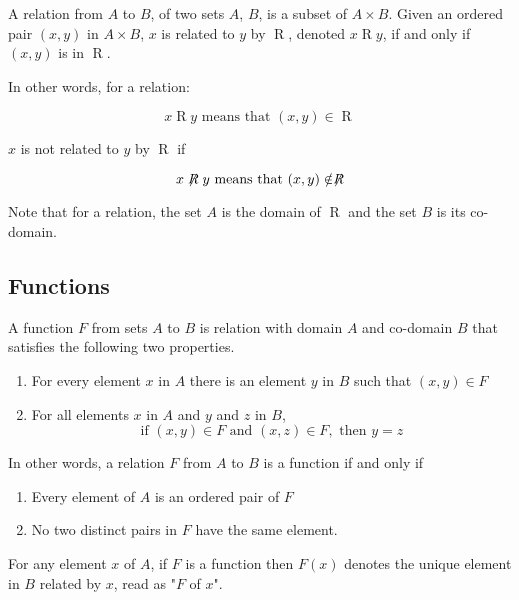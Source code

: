 \documentclass[11pt]{article}
\newcommand\rel{\mathrel{R}}
\newcommand\nrel{\not \mathrel{R}}
\begin{document}
\begin{definition}[Relation]\label{def:relation}
    A relation from $A$ to $B$, of two sets $A$, $B$, is a subset of $A \times B$.
    Given an ordered pair $(x, y)$ in $A \times B$, $x$ is related to $y$ by $\rel$,
    denoted $x \rel y$, if and only if $(x, y)$ is in $\rel$. 
    
    In other words, for a relation:

    \begin{equation*}
        x \rel y \text{ means that } (x,y) \in \rel
    \end{equation*}

    $x$ is not related to $y$ by $\mathrel{R}$ if 

    \begin{equation*}
        x \nrel y \text { means that } (x,y) \notin \nrel
    \end{equation*}

    Note that for a relation, the set $A$ is the domain of
    $\rel$ and the set $B$ is its co-domain.
    
\end{definition}

\subsection{Functions}

\begin{definition}[Functions]\label{def:function}
    A function $F$ from sets $A$ to $B$ is relation with domain $A$ and co-domain $B$
    that satisfies the following two properties.
    
    \begin{enumerate}
        \item For every element $x$ in $A$ there is an element $y$ in $B$ such that $(x,y) \in F$
        \item For all elements $x$ in $A$ and $y$ and $z$ in $B$,
            \begin{equation*}
                \text{if } (x,y) \in F \text{ and } (x,z) \in F, \text{ then } y = z
            \end{equation*}
    \end{enumerate}

    In other words, a relation $F$ from $A$ to $B$ is a function if and only if
    \begin{enumerate}
        \item Every element of $A$ is an ordered pair of $F$
        \item No two distinct pairs in $F$ have the same element.
    \end{enumerate}
    
    For any element $x$ of $A$, if $F$ is a function then $F(x)$ denotes
    the unique element in $B$ related by $x$, read as "$F$ of $x$".
\end{definition}
\end{document}
